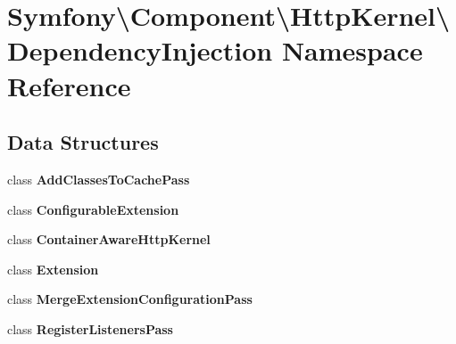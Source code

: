 \section{Symfony\textbackslash{}Component\textbackslash{}Http\+Kernel\textbackslash{}Dependency\+Injection Namespace Reference}
\label{namespace_symfony_1_1_component_1_1_http_kernel_1_1_dependency_injection}
\subsection*{Data Structures}
\begin{DoxyCompactItemize}
\item 
class {\bf Add\+Classes\+To\+Cache\+Pass}
\item 
class {\bf Configurable\+Extension}
\item 
class {\bf Container\+Aware\+Http\+Kernel}
\item 
class {\bf Extension}
\item 
class {\bf Merge\+Extension\+Configuration\+Pass}
\item 
class {\bf Register\+Listeners\+Pass}
\end{DoxyCompactItemize}
